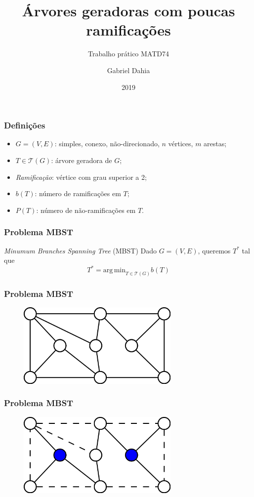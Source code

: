 \documentclass[14pt]{beamer}
\title{\'Arvores geradoras com poucas ramifica\c{c}\~oes}
\subtitle{Trabalho pr\'atico MATD74}
\author{Gabriel Dahia}
\institute{Universidade Federal da Bahia}
\date{2019}
\begin{document}
\frame{\titlepage}

\begin{frame}
\frametitle{Defini\c{c}\~oes}
\begin{itemize}
\item<1-> $G = (V, E)$: simples, conexo, n\~ao-direcionado, $n$ v\'ertices, $m$ arestas;
\item<2-> $T \in \mathcal{T}(G)$: \'arvore geradora de $G$;
\item<3-> \emph{Ramifica\c{c}\~ao}: v\'ertice com grau superior a 2;
\item<4-> $b(T)$: n\'umero de ramifica\c{c}\~oes em $T$;
\item<5-> $P(T)$: n\'umero de n\~ao-ramifica\c{c}\~oes em $T$.
\end{itemize}
\end{frame}

\begin{frame}
\frametitle{Problema MBST}
\begin{block}{\textit{Minumum Branches Spanning Tree} (MBST)}
Dado $G = (V, E)$, queremos $T^*$ tal que
\begin{equation}
T^* = \mathrm{arg\,min}_{T \in \mathcal{T}(G)} b(T)
\end{equation}
\end{block}
\end{frame}

\begin{frame}
\frametitle{Problema MBST}
\begin{figure}
\includegraphics[width=0.7\textwidth]{figures/minbst1.png}
\end{figure}
\end{frame}

\begin{frame}
\frametitle{Problema MBST}
\begin{figure}
\includegraphics[width=0.7\textwidth]{figures/minbst2.png}
\end{figure}
\end{frame}
\end{document}
